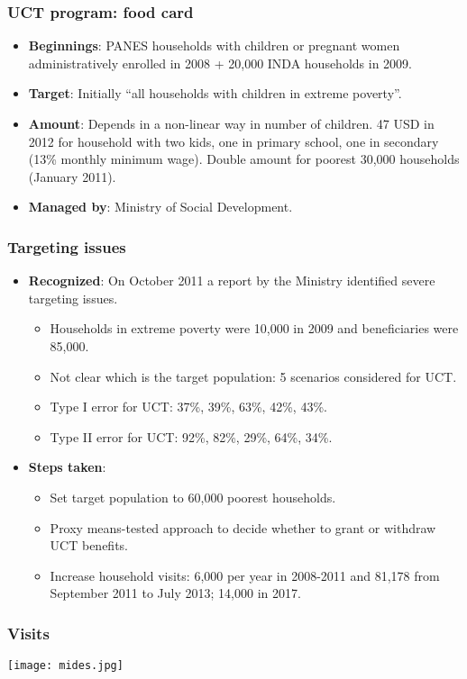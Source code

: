 \documentclass{beamer}
\begin{document}
\begin{frame}
\frametitle{UCT program: food card}
\begin{itemize}
	\item \textbf{Beginnings}: PANES households with children or pregnant women administratively enrolled in 2008 + 20,000 INDA households in 2009.
	\item \textbf{Target}: Initially ``all households with children in extreme poverty''.
	\item \textbf{Amount}: Depends in a non-linear way in number of children. 47 USD in 2012 for household with two kids, one in primary school, one in secondary (13\% monthly minimum wage). Double amount for poorest 30,000 households (January 2011).
	\item \textbf{Managed by}: Ministry of Social Development.		
\end{itemize}
\end{frame}
	
\begin{frame}
\frametitle{Targeting issues}
		\begin{itemize}
			\item \textbf{Recognized}: On October 2011 a report by the Ministry identified severe targeting issues.
			\begin{itemize}
				\item Households in extreme poverty were 10,000 in 2009 and beneficiaries were 85,000.
				\item Not clear which is the target population: 5 scenarios considered for UCT.
				\item Type I error for UCT: 37\%, 39\%, 63\%, 42\%, 43\%.
				\item Type II error for UCT: 92\%, 82\%, 29\%, 64\%, 34\%.
			\end{itemize}
			\item \textbf{Steps taken}:
			\begin{itemize}
				\item Set target population to 60,000 poorest households.
				\item Proxy means-tested approach to decide whether to grant or withdraw UCT benefits.
				\item Increase household visits: 6,000 per year in 2008-2011 and 81,178 from September 2011 to July 2013; 14,000 in 2017.
			\end{itemize}	
		\end{itemize}
\end{frame}

\begin{frame}
\frametitle{Visits}
\begin{center}
	\texttt{[image: mides.jpg]}
	\label{mides}
\end{center}
\end{frame}
\end{document}
